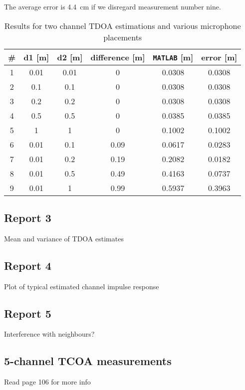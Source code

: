\documentclass[11pt,titlepage]{report}
\begin{document}
The average error is \SI{4.4}{\centi\meter} if we disregard measurement number nine. 
\begin{table}[H]
	\centering
\begin{tabular}{c c c c c c}
\hline\hline
\# & d1 [m] & d2 [m] & difference [m]& \texttt{MATLAB} [m] & error [m] \\
\hline
1	&	0.01	&	0.01&	0	&	0.0308	&	0.0308	\\
2	&	0.1		&	0.1	&	0	&	0.0308	&	0.0308	\\
3	&	0.2		&	0.2	&	0	&	0.0308	&	0.0308	\\
4	&	0.5		&	0.5	&	0	&	0.0385	&	0.0385	\\
5	&	1		&	1	&	0	&	0.1002	&	0.1002	\\
6	&	0.01	&	0.1	&	0.09&	0.0617	&	0.0283	\\
7	&	0.01	&	0.2	&	0.19&	0.2082	&	0.0182	\\
8	&	0.01	&	0.5	&	0.49&	0.4163	&	0.0737	\\
9	&	0.01	&	1	&	0.99&	0.5937	&	0.3963	\\
\hline
\end{tabular} 
	\caption{Results for two channel TDOA estimations and various microphone placements}
	\label{tab:ass2_task2_results}
\end{table}

\subsection{Report 3}
Mean and variance of TDOA estimates

\subsection{Report 4}
Plot of typical estimated channel impulse response

\subsection{Report 5}
Interference with neighbours?

\subsection{5-channel TCOA measurements}
Read page 106 for more info
\end{document}
